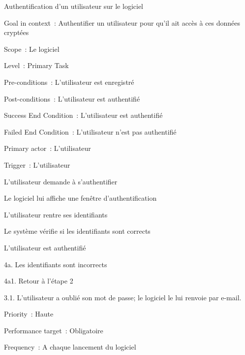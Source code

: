 \begin{usecase}{Authentification d'un utilisateur sur le logiciel}
\begin{information}
\item[Goal in context~:] Authentifier un utilisateur pour qu'il ait accès à ces données cryptées
\item[Scope~:] Le logiciel
\item[Level~:] Primary Task
\item[Pre-conditions~:] L'utilisateur est enregistré
\item[Post-conditions~:] L'utilisateur est authentifié
\item[Success End Condition~:] L'utilisateur est authentifié
\item[Failed End Condition~:] L'utilisateur n'est pas authentifié
\item[Primary actor~:] L'utilisateur
\item[Trigger~:] L'utilisateur
\\
\end{information}
\begin{scenario}
\item L'utilisateur demande à s'authentifier
\item Le logiciel lui affiche une fenêtre d'authentification
\item L'utilisateur rentre ses identifiants
\item Le système vérifie si les identifiants sont corrects
\item L'utilisateur est authentifié
\\
\end{scenario}

\begin{extension}
\item[4a.] Les identifiants sont incorrects
\item[4a1.] Retour à l'étape 2
\\
\end{extension}

\begin{variation}
\item[3.1.] L'utilisateur a oublié son mot de passe; le logiciel le lui renvoie par e-mail.
\\
\end{variation}

\begin{relatedinformation}
\item[Priority~:] Haute
\item[Performance target~:] Obligatoire
\item[Frequency~:] A chaque lancement du logiciel
\\
\end{relatedinformation}

\end{usecase}

